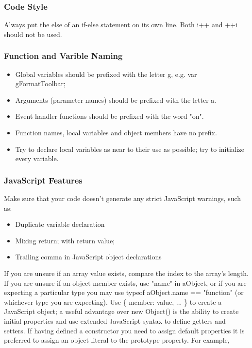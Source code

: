 \documentclass[letterpaper,12pt]{article}
\begin{document}
\subsubsection{Code Style}
Always put the else of an if-else statement on its own line.
Both i++ and ++i should not be used.
\subsubsection{Function and Varible Naming}
\begin{itemize}
\item Global variables should be prefixed with the letter g, e.g. var gFormatToolbar;
\item Arguments (parameter names) should be prefixed with the letter a.
\item Event handler functions should be prefixed with the word "on".
\item Function names, local variables and object members have no prefix.
\item Try to declare local variables as near to their use as possible; try to initialize every variable.
\end{itemize}

\subsubsection{JavaScript Features}
Make sure that your code doesn't generate any strict JavaScript warnings, such as:
\begin{itemize}
      	  \item{Duplicate variable declaration}
      	  \item{Mixing return; with return value;}
      	  \item{Trailing comma in JavaScript object declarations}
\end{itemize}    	
If you are unsure if an array value exists, compare the index to the array's length. If you are unsure if an object member exists, use "name" in aObject, or if you are expecting a particular type you may use typeof aObject.name == "function" (or whichever type you are expecting).
Use \{ member: value, ... \} to create a JavaScript object; a useful advantage over new Object() is the ability to create initial properties and use extended JavaScript syntax to define getters and setters.  If having defined a constructor you need to assign default properties it is preferred to assign an object literal to the prototype property. For example,
\end{document}
